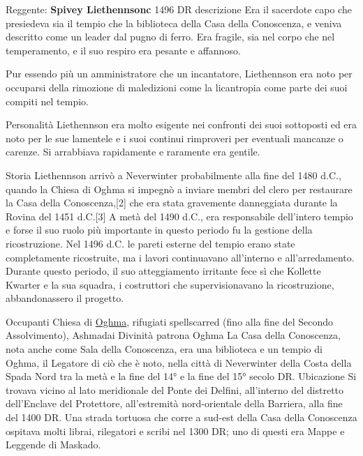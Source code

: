 \documentclass{article}
\begin{document}
Reggente: \textbf{Spivey Liethennsonc} 1496 DR
descrizione\newline
Era il sacerdote capo che presiedeva sia il tempio che la biblioteca della Casa della Conoscenza, e veniva descritto come un leader dal pugno di ferro. Era fragile, sia nel corpo che nel temperamento, e il suo respiro era pesante e affannoso.

Pur essendo più un amministratore che un incantatore, Liethennson era noto per occuparsi della rimozione di maledizioni come la licantropia come parte dei suoi compiti nel tempio.\newline

Personalità\newline
Liethennson era molto esigente nei confronti dei suoi sottoposti ed era noto per le sue lamentele e i suoi continui rimproveri per eventuali mancanze o carenze. Si arrabbiava rapidamente e raramente era gentile.\newline

Storia
Liethennson arrivò a Neverwinter probabilmente alla fine del 1480 d.C., quando la Chiesa di Oghma si impegnò a inviare membri del clero per restaurare la Casa della Conoscenza,[2] che era stata gravemente danneggiata durante la Rovina del 1451 d.C.[3] A metà del 1490 d.C., era responsabile dell'intero tempio e forse il suo ruolo più importante in questo periodo fu la gestione della ricostruzione. Nel 1496 d.C. le pareti esterne del tempio erano state completamente ricostruite, ma i lavori continuavano all'interno e all'arredamento. Durante questo periodo, il suo atteggiamento irritante fece sì che Kollette Kwarter e la sua squadra, i costruttori che supervisionavano la ricostruzione, abbandonassero il progetto.\newline

Occupanti
Chiesa di \hyperlink{https://forgottenrealms.fandom.com/wiki/Oghma}{Oghma}, rifugiati spellscarred (fino alla fine del Secondo Assolvimento), Ashmadai
Divinità patrona
Oghma
La Casa della Conoscenza, nota anche come Sala della Conoscenza, era una biblioteca e un tempio di Oghma, il Legatore di ciò che è noto, nella città di Neverwinter della Costa della Spada Nord tra la metà e la fine del 14° e la fine del 15° secolo DR.
Ubicazione
Si trovava vicino al lato meridionale del Ponte dei Delfini, all'interno del distretto dell'Enclave del Protettore, all'estremità nord-orientale della Barriera, alla fine del 1400 DR. Una strada tortuosa che corre a sud-est della Casa della Conoscenza ospitava molti librai, rilegatori e scribi nel 1300 DR; uno di questi era Mappe e Leggende di Maskado.
\end{document}
